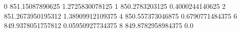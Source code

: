 0 851.15087890625 1.2725830078125
1 850.2783203125 0.4000244140625
2 851.2673950195312 1.38909912109375
4 850.557373046875 0.6790771484375
6 849.9378051757812 0.05950927734375
8 849.8782958984375 0.0
